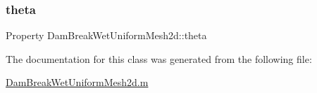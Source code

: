 \subsubsection{\texorpdfstring{theta}{theta}}
{\footnotesize\ttfamily Property Dam\+Break\+Wet\+Uniform\+Mesh2d\+::theta\hspace{0.3cm}{\ttfamily [protected]}}



The documentation for this class was generated from the following file\+:\begin{DoxyCompactItemize}
\item 
\hyperlink{_dam_break_wet_uniform_mesh2d_8m}{Dam\+Break\+Wet\+Uniform\+Mesh2d.\+m}\end{DoxyCompactItemize}

